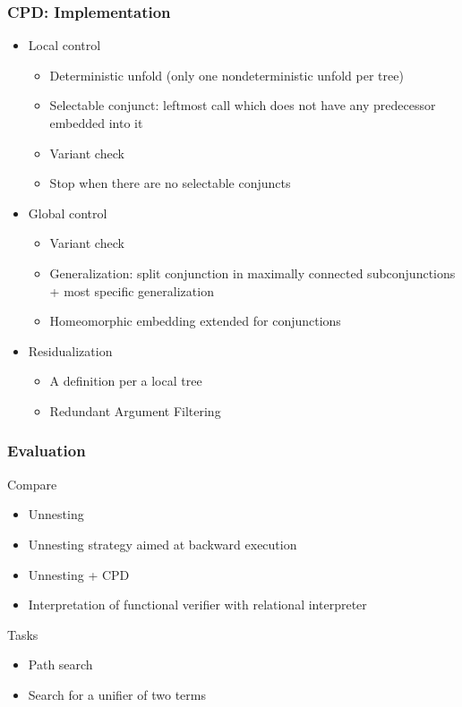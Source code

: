 \documentclass[xcolor=table]{beamer}
\begin{document}
\begin{frame}[fragile]
  \transwipe[direction=90]
  \frametitle{CPD: Implementation}
\begin{itemize}
  \item Local control
  \begin{itemize}
    \item Deterministic unfold (only one nondeterministic unfold per tree)
    \item Selectable conjunct: leftmost call which does not have any predecessor embedded into it
    \item Variant check
    \item Stop when there are no selectable conjuncts
  \end{itemize}
  \item Global control
  \begin{itemize}
    \item Variant check
    \item Generalization: split conjunction in maximally connected subconjunctions + most specific generalization
    \item Homeomorphic embedding extended for conjunctions
  \end{itemize}
  \item Residualization
  \begin{itemize}
    \item A definition per a local tree
    \item Redundant Argument Filtering
  \end{itemize}
\end{itemize}
\end{frame}

\begin{frame}[fragile]
  \transwipe[direction=90]
  \frametitle{Evaluation}
  Compare

\begin{itemize}
  \item Unnesting
  \item Unnesting strategy aimed at backward execution
  \item Unnesting + CPD
  \item Interpretation of functional verifier with relational interpreter
\end{itemize}

Tasks

\begin{itemize}
  \item Path search
  \item Search for a unifier of two terms
\end{itemize}

\end{frame}
\end{document}
